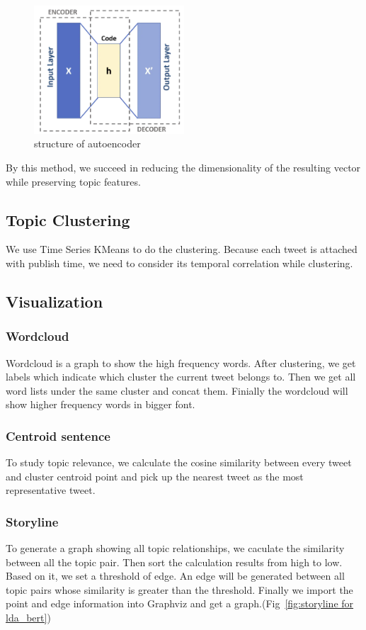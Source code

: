 \begin{figure}[h]
\centering
\includegraphics[width=0.5\textwidth]{imgs/framework/autoencoder.png}
\caption{structure of autoencoder}
\label{fig:autoencoder}
\end{figure}

By this method, we succeed in reducing the dimensionality of the resulting vector while preserving topic features.

\subsection{Topic Clustering}
We use Time Series KMeans to do the clustering. Because each tweet is attached with publish time, we need to consider its temporal correlation while clustering. 

\subsection{Visualization}
\subsubsection{Wordcloud}
Wordcloud is a graph to show the high frequency words. After clustering, we get labels which indicate which cluster the current tweet belongs to. Then we get all word lists under the same cluster and concat them. Finially the wordcloud will show higher frequency words in bigger font.
\subsubsection{Centroid sentence}
To study topic relevance, we calculate the cosine similarity between every tweet and cluster centroid point and pick up the nearest tweet as the most representative tweet.  
\subsubsection{Storyline}
To generate a graph showing all topic relationships, we caculate the similarity between all the topic pair. Then sort the calculation results from high to low. Based on it, we set a threshold of edge. An edge will be generated between all topic pairs whose similarity is greater than the threshold. Finally we import the point and edge information into Graphviz and get a graph.(Fig~\ref{fig:storyline for lda_bert}) 
